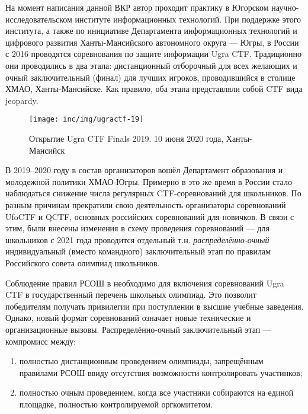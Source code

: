 На момент написания данной ВКР автор проходит практику в Югорском научно-исследовательском институте информационных технологий. При поддержке этого института, а также по инициативе Департамента информационных технологий и цифрового развития Ханты-Мансийского автономного округа — Югры, в России с 2016 проводятся соревнования по защите информации Ugra CTF. Традиционно они проводились в два этапа: дистанционный отборочный для всех желающих и очный заключительный (финал) для лучших игроков, проводившийся в столице ХМАО, Ханты-Мансийске. Как правило, оба этапа представляли собой CTF вида jeopardy.

\begin{figure}
  \centering
  \texttt{[image: inc/img/ugractf-19]}
  \caption{Открытие Ugra CTF Finals 2019. 10 июня 2020 года, Ханты-Мансийск}
  \label{fig:ugractf-19}
\end{figure}


В 2019–2020 году в состав организаторов вошёл Департамент образования и молодежной политики ХМАО-Югры. Примерно в это же время в России стало наблюдаться снижение числа регулярных CTF-соревнований для школьников. По разным причинам прекратили свою деятельность организаторы соревнований UfoCTF\cite{UfoCTF} и QCTF\cite{QCTF}, основных российских соревнований для новичков. В связи с этим, были внесены изменения в схему проведения соревнований — для школьников с 2021 года проводится отдельный т.н. \textit{распределённо-очный} индивидуальный (вместо командного) заключительный этап по правилам Российского совета олимпиад школьников.


Соблюдение правил РСОШ в необходимо для включения соревнований Ugra CTF в государственный перечень школьных олимпиад. Это позволит победителям получать привилегии при поступлении в высшие учебные заведения. Однако, новый формат соревнований означает новые технические и организационные вызовы. Распределённо-очный заключительный этап --- компромисс между:
\begin{enumerate}
  \item полностью дистанционным проведением олимпиады, запрещённым правилами РСОШ ввиду отсутствия возможности контролировать участинков;
  \item полностью очным проведением, когда все участники собираются на единой площадке, полностью контролируемой оргкомитетом.
\end{enumerate}

